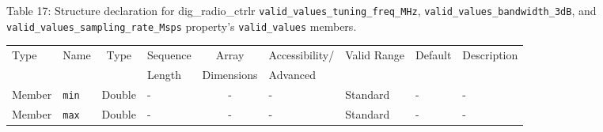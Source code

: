 \documentclass{article}
\def\comp{dig\_radio\_ctrlr}
\begin{document}
\begin{landscape}
	\noindent Table \hypertarget{tab17}{17}: Structure declaration for \comp{} \verb+valid_values_tuning_freq_MHz+, \verb+valid_values_bandwidth_3dB+, and \\ \verb+valid_values_sampling_rate_Msps+ property's \verb+valid_values+ members.
	\begin{scriptsize}
		\noindent\begin{longtable}{|p{1.8cm}|p{3.6cm}|c|p{4cm}|c|p{2cm}|p{1.7cm}|p{0.8cm}|p{4.69cm}|}
			\hline
			\rowcolor{blue}
			Type         & Name                                & Type & Sequence & Array      & Accessibility/ & Valid Range  & Default & Description                                                                                                                                                                                                                       \\
			\rowcolor{blue}
			             &                                     &      & Length   & Dimensions & Advanced       &              &         &                                                                                                                                                                                                                             \\
			\hline
			Member       & \verb+min+                          & Double & -       & -          & -              & Standard     & -       & - \\
			\hline
			Member       & \verb+max+                          & Double & -       & -          & -              & Standard     & -       & - \\
			\hline
		\end{longtable}
	\end{scriptsize}

\end{landscape}


 


\begin{thebibliography}{1}

   \\

\end{thebibliography}
\end{document}
